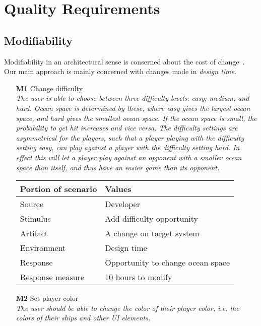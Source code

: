 \chapter{Quality Requirements}

\section{Modifiability}
Modifiability in an architectural sense is conserned about the cost of change \cite{pensum}. Our main approach is mainly concerned with changes made in \emph{design time}.

    \begin{itemize}
        \item[\textbf{M1}] Change difficulty \\
        \textit{\small{The user is able to choose between three difficulty levels: easy; medium; and hard. Ocean space is determined by these, where easy gives the largest ocean space, and hard gives the smallest ocean space. If the ocean space is small, the probability to get hit increases and vice versa. The difficulty settings are asymmetrical for the players, such that a player playing with the difficulty setting \emph{easy}, can play against a player with the difficulty setting \emph{hard}. In effect this will let a player play against an opponent with a smaller ocean space than itself, and thus have an easier game than its opponent.}}
        
        \begin{tabular}{| l | l |}
            \hline
            \rowcolor[gray]{0.8}
            \textbf{Portion of scenario} & \textbf{Values} \\
            \hline
            Source &  Developer \\
            Stimulus & Add difficulty opportunity \\
            Artifact & A change on target system \\
            Environment & Design time \\
            Response & Opportunity to change ocean space  \\
            Response measure & 10 hours to modify  \\
            \hline
        \end{tabular}
        
        \item[\textbf{M2}] Set player color \\
        \textit{\small{The user should be able to change the color of their player color, i.e. the colors of their ships and other UI elements.}}
        

\end{itemize}
